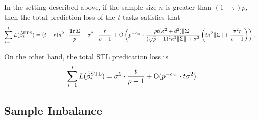 \begin{corollary}\label{prop_same_cov}
	In the setting described above, if the sample size $n$ is greater than $(1 + \tau) p$, then the total prediction loss of the $t$ tasks satisfies that
	\begin{align*} 
	 \sum_{i=1}^t L(\hat{\beta}_i^{\textup{HPS}})&= (t-r) \kappa^2 \cdot \frac{\operatorname{Tr}\Sigma}{p}  + \sigma^2 \cdot \frac{r}{\rho-1} +\operatorname{O}\left( p^{-c_\infty} \cdot\frac{\rho t(\kappa^2 + d^2) \|\Sigma\|}{(\sqrt{\rho}-1)^2 \kappa^2  \|\Sigma\| + \sigma^2}   \left( t \kappa^2 \|\Sigma \| + \frac{\sigma^2 r}{\rho-1} \right)  \right) .
	\end{align*}
\end{corollary}
On the other hand, the total STL predication loss is 
\begin{align*}
 \sum_{i=1}^t L(\hat{\beta}_i^{\textup{STL}}) =\sigma^2\cdot \frac{t}{ \rho-1}  +\operatorname{O}(p^{-c_\infty}\cdot t \sigma^2 ).
	 \end{align*}

 


\subsection{Sample Imbalance}

